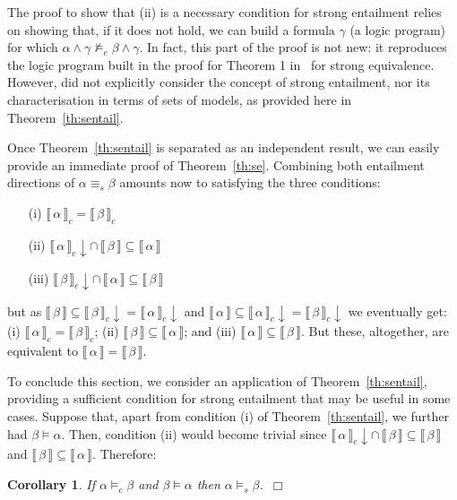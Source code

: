 \documentclass{tlp}
\def\down{\downarrow}
\newcommand{\den}[1]{\llbracket \, #1 \, \rrbracket}
\def\qed{~\hfill$\Box$}
\newtheorem{corollary}{Corollary}
\begin{document}
The proof to show that (ii) is a necessary condition for strong entailment relies on showing that, if it does not hold, we can build a formula $\gamma$ (a logic program) for which $\alpha \wedge \gamma \not\models_e \beta \wedge \gamma$. In fact, this part of the proof is not new: it reproduces the logic program built in the proof for Theorem 1 in~\cite{LPV01} for strong equivalence. However, \cite{LPV01} did not explicitly consider the concept of strong entailment, nor its characterisation in terms of sets of models, as provided here in Theorem~\ref{th:sentail}. 

Once Theorem~\ref{th:sentail} is separated as an independent result, we can easily provide an immediate proof of Theorem~\ref{th:se}. Combining both entailment directions of $\alpha \equiv_s \beta$ amounts now to satisfying the three conditions: 
\begin{enumerate}
\item[(i)] $\den{\alpha}_c=\den{\beta}_c$
\item[(ii)] $\den{\alpha}_c \down \cap \, \den{\beta} \subseteq  \den{\alpha}$ 
\item[(iii)] $\den{\beta}_c \down \cap \, \den{\alpha} \subseteq  \den{\beta}$
\end{enumerate}
\noindent but as $\den\beta \subseteq \den{\beta}_c \down = \den{\alpha}_c \down$ and $\den\alpha \subseteq \den{\alpha}_c \down = \den{\beta}_c \down$ we eventually get: (i) $\den{\alpha}_c=\den{\beta}_c$; (ii) $\den{\beta} \subseteq  \den{\alpha}$; and (iii) $\den{\alpha} \subseteq  \den{\beta}$. But these, altogether, are equivalent to $\den\alpha = \den\beta$.

To conclude this section, we consider an application of Theorem~\ref{th:sentail}, providing a sufficient condition for strong entailment that may be useful in some cases. Suppose that, apart from condition (i) of Theorem~\ref{th:sentail}, we further had $\beta \models \alpha$. Then, condition (ii) would become trivial since $\den{\alpha}_c \down \cap \, \den{\beta} \subseteq  \den{\beta}$ and $\den{\beta} \subseteq \den\alpha$. Therefore:

\begin{corollary}\label{cor:ex}
If $\alpha \models_c \beta$ and $\beta \models \alpha$ then $\alpha \models_s \beta$.\qed
\end{corollary}
\end{document}
